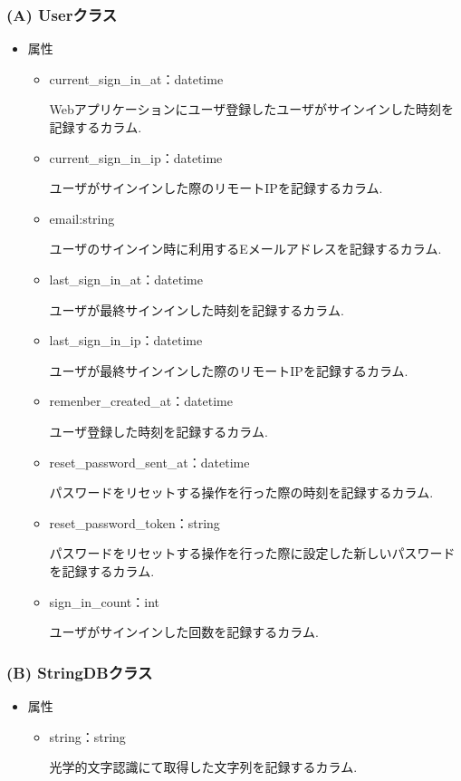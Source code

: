 \subsubsection{(A) Userクラス}
\begin{itemize}
\item 属性

\begin{itemize}
\item current\_sign\_in\_at：datetime

Webアプリケーションにユーザ登録したユーザがサインインした時刻を記録するカラム.

\item current\_sign\_in\_ip：datetime

ユーザがサインインした際のリモートIPを記録するカラム.

\item email:string

ユーザのサインイン時に利用するEメールアドレスを記録するカラム.

\item last\_sign\_in\_at：datetime

ユーザが最終サインインした時刻を記録するカラム.

\item last\_sign\_in\_ip：datetime

ユーザが最終サインインした際のリモートIPを記録するカラム.

\item remenber\_created\_at：datetime

ユーザ登録した時刻を記録するカラム.

\item reset\_password\_sent\_at：datetime

パスワードをリセットする操作を行った際の時刻を記録するカラム.

\item reset\_password\_token：string

パスワードをリセットする操作を行った際に設定した新しいパスワードを記録するカラム.

\item sign\_in\_count：int

ユーザがサインインした回数を記録するカラム.
\end{itemize}

\end{itemize}

\subsubsection{(B) StringDBクラス}
\begin{itemize}
\item 属性

\begin{itemize}
\item string：string

光学的文字認識にて取得した文字列を記録するカラム.
\end{itemize}

\end{itemize}

